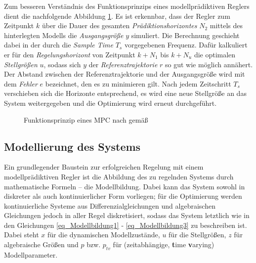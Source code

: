 Zum besseren Verständnis des Funktionsprinzips eines modellprädiktiven Reglers dient die nachfolgende Abbildung \ref{fig_MPCVerhalten}.
Es ist erkennbar, dass der Regler zum Zeitpunkt $k$ über die Dauer des gesamten \textit{Prädiktionshorizontes} $N_2$ mittels des hinterlegten Modells die \textit{Ausgangsgröße} $y$ simuliert.
Die Berechnung geschieht dabei in der durch die \textit{Sample Time} $T_s$ vorgegebenen Frequenz.
Dafür kalkuliert er für den \textit{Regelungshorizont} von Zeitpunkt $k+N_1$ bis $k+N_u$ die optimalen \textit{Stellgrößen} $u$, sodass sich $y$ der \textit{Referenztrajektorie} $r$ so gut wie möglich annähert.
Der Abstand zwischen der Referenztrajektorie und der Ausgangsgröße wird mit dem \textit{Fehler} $e$ bezeichnet, den es zu minimieren gilt.
Nach jedem Zeitschritt $T_s$ verschieben sich die Horizonte entsprechend, es wird eine neue Stellgröße an das System weitergegeben und die Optimierung wird erneut durchgeführt. \cite[S.3]{Schwenzer}

\begin{figure}[h!]
    \centering
    \setlength{\fboxsep}{1pt}
    \setlength{\fboxrule}{1pt}
\caption[Funktionsprinzip eines MPC]{Funktionsprinzip eines MPC nach \cite[S.3]{Schwenzer} gemäß \cite{Richalet}}
    \label{fig_MPCVerhalten}
\end{figure}

\subsection{Modellierung des Systems} \label{subsec_Modellbildung}
Ein grundlegender Baustein zur erfolgreichen Regelung mit einem modellprädiktiven Regler ist die Abbildung des zu regelnden Systems durch mathematische Formeln – die Modellbildung.
Dabei kann das System sowohl in diskreter als auch kontinuierlicher Form vorliegen; für die Optimierung werden kontinuierliche Systeme aus Differenzialgleichungen und algebraischen Gleichungen jedoch in aller Regel diskretisiert, sodass das System letztlich wie in den Gleichungen \ref{eq_Modellbildung1} - \ref{eq_Modellbildung3} zu beschreiben ist.
Dabei steht $x$ für die dynamischen Modellzustände, $u$ für die Stellgrößen, $z$ für algebraische Größen und $p$ bzw.
$p_{tv}$ für (zeitabhängige, \textbf{t}ime \textbf{v}arying) Modellparameter. \cite[S.3]{Schwenzer}\cite{Dompc1}

